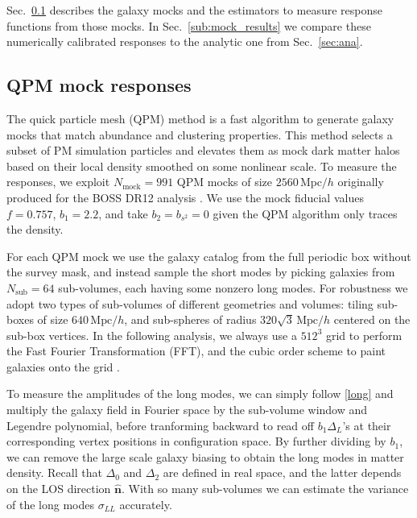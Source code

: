 \documentclass[a4paper,11pt]{article}
\newcommand{\los}{{\hat{\mathbf{n}}}}
\newcommand{\Mpc}{\mathrm{Mpc}}
\newcommand{\Mpch}{{\,\Mpc/h}}
\newcommand{\mock}{\mathrm{mock}}
\newcommand{\sub}{\mathrm{sub}}
\begin{document}
Sec.~\ref{sub:mock_resp} describes the galaxy mocks and the estimators to
measure response functions from those mocks.
In Sec.~\ref{sub:mock_results} we compare these numerically calibrated responses
to the analytic one from Sec.~\ref{sec:ana}.



\subsection{QPM mock responses}
\label{sub:mock_resp}

The quick particle mesh (QPM) \cite{White14b} method is a fast algorithm to
generate galaxy mocks that match abundance and clustering properties.
This method selects a subset of PM simulation particles and elevates them as mock
dark matter halos based on their local density smoothed on some nonlinear
scale.
To measure the responses, we exploit $N_\mock=991$ QPM mocks of size
$2560\Mpch$ originally produced for the BOSS DR12 analysis \cite{AlamEtAl17}.
We use the mock fiducial values $f=0.757$, $b_1=2.2$, and take $b_2=b_{s^2}=0$
given the QPM algorithm only traces the density.

For each QPM mock we use the galaxy catalog from the full periodic box without
the survey mask, and instead sample the short modes by picking galaxies from
$N_\sub=64$ sub-volumes, each having some nonzero long modes.
For robustness we adopt two types of sub-volumes of different geometries and
volumes: tiling sub-boxes of size $640\Mpch$, and sub-spheres of radius
$320\sqrt3\Mpch$ centered on the sub-box vertices.
In the following analysis, we always use a $512^3$ grid to perform the Fast
Fourier Transformation (FFT), and the cubic order scheme to paint galaxies onto
the grid \cite{SefusattiEtAl16}.

To measure the amplitudes of the long modes, we can simply follow \eqref{long}
and multiply the galaxy field in Fourier space by the sub-volume window and
Legendre polynomial, before tranforming backward to read off $b_1\Delta_L$'s at
their corresponding vertex positions in configuration space.
By further dividing by $b_1$, we can remove the large scale galaxy biasing to
obtain the long modes in matter density.
%
%
Recall that $\Delta_0$ and $\Delta_2$ are defined in real space, and the latter
depends on the LOS direction $\los$.
With so many sub-volumes we can estimate the variance of the long modes
$\sigma_{LL}$ accurately.
\end{document}
